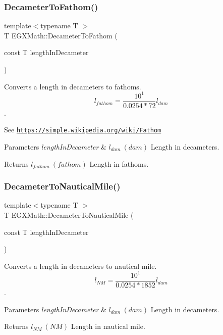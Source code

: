 \subsubsection{\texorpdfstring{Decameter\+To\+Fathom()}{DecameterToFathom()}}
{\footnotesize\ttfamily template$<$typename T $>$ \\
T E\+G\+X\+Math\+::\+Decameter\+To\+Fathom (\begin{DoxyParamCaption}\item[{const T}]{length\+In\+Decameter }\end{DoxyParamCaption})}



Converts a length in decameters to fathoms. \[ l_{fathom}= \frac{10^{1}}{0.0254 * 72} l_{dam} \]. 

See \href{https://simple.wikipedia.org/wiki/Fathom}{\tt https\+://simple.\+wikipedia.\+org/wiki/\+Fathom} 
\begin{DoxyParams}{Parameters}
{\em length\+In\+Decameter} & $ l_{dam}\ (dam)$ Length in decameters. \\
\hline
\end{DoxyParams}
\begin{DoxyReturn}{Returns}
$ l_{fathom}\ (fathom)$ Length in fathoms. 
\end{DoxyReturn}
\mbox{\label{group___e_g_x_math-_conversions-_length_conversions-_decameter-_nautical_ga099c662953d7c82d538755bd699993b1}} 
\subsubsection{\texorpdfstring{Decameter\+To\+Nautical\+Mile()}{DecameterToNauticalMile()}}
{\footnotesize\ttfamily template$<$typename T $>$ \\
T E\+G\+X\+Math\+::\+Decameter\+To\+Nautical\+Mile (\begin{DoxyParamCaption}\item[{const T}]{length\+In\+Decameter }\end{DoxyParamCaption})}



Converts a length in decameters to nautical mile. \[ l_{NM}= \frac{10^{1}}{0.0254 * 1852} l_{dam} \]. 


\begin{DoxyParams}{Parameters}
{\em length\+In\+Decameter} & $ l_{dam}\ (dam)$ Length in decameters. \\
\hline
\end{DoxyParams}
\begin{DoxyReturn}{Returns}
$ l_{NM}\ (NM)$ Length in nautical mile. 
\end{DoxyReturn}
